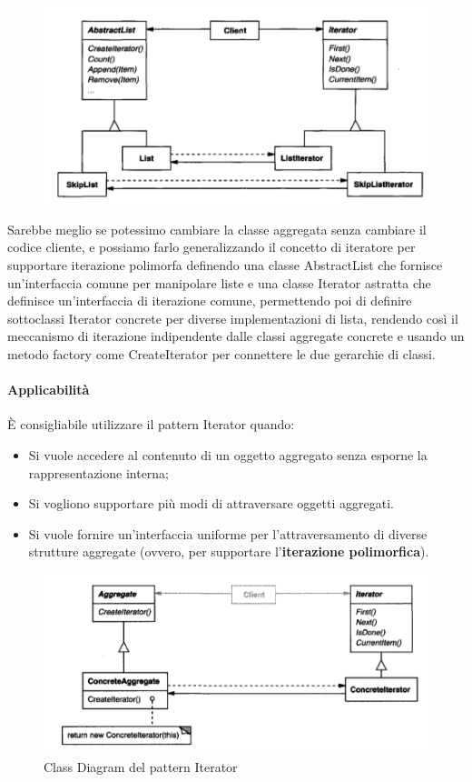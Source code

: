 \begin{figure}[H]
    \centering
    \includegraphics[width=0.75\linewidth]{assets/pattern/iterator/iterator-esempio-2.png}
\end{figure}

Sarebbe meglio se potessimo cambiare la classe aggregata senza cambiare il codice cliente, e possiamo farlo generalizzando il concetto di iteratore per supportare iterazione polimorfa definendo una classe AbstractList che fornisce un'interfaccia comune per manipolare liste e una classe Iterator astratta che definisce un'interfaccia di iterazione comune, permettendo poi di definire sottoclassi Iterator concrete per diverse implementazioni di lista, rendendo così il meccanismo di iterazione indipendente dalle classi aggregate concrete e usando un metodo factory come CreateIterator per connettere le due gerarchie di classi.

\paragraph{Applicabilità} È consigliabile utilizzare il pattern Iterator quando:
\begin{itemize}
    \item Si vuole accedere al contenuto di un oggetto aggregato senza esporne la rappresentazione interna;
    \item Si vogliono supportare più modi di attraversare oggetti aggregati.
    \item Si vuole fornire un'interfaccia uniforme per l'attraversamento di diverse strutture aggregate (ovvero, per supportare l'\textbf{iterazione polimorfica}).
\end{itemize}

\begin{figure}[H]
    \centering
    \includegraphics[width=0.75\linewidth]{assets/pattern/iterator/iterator-struttura.png}
    \caption{Class Diagram del pattern Iterator}
\end{figure}

